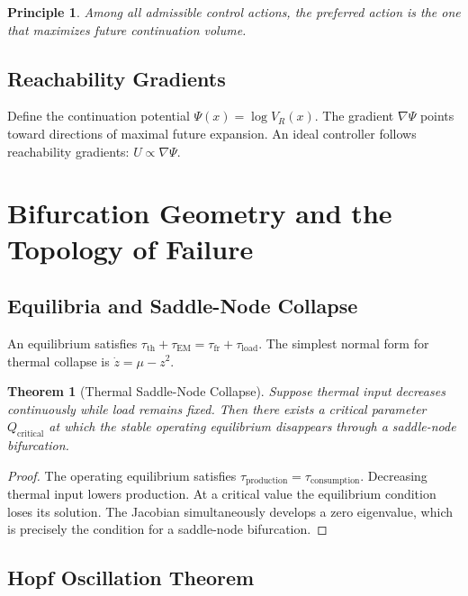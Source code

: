 \documentclass[12pt,a4paper]{article}
\newtheorem{theorem}{Theorem}[section]
\newtheorem*{principle}{Principle}
\begin{document}
\begin{principle}
Among all admissible control actions, the preferred action is the one that maximizes future continuation volume.
\end{principle}

\subsection{Reachability Gradients}

Define the continuation potential $\Psi(x) = \log V_R(x)$. The gradient $\nabla\Psi$ points toward directions of maximal future expansion. An ideal controller follows reachability gradients: $U \propto \nabla\Psi$.

\section{Bifurcation Geometry and the Topology of Failure}

\subsection{Equilibria and Saddle-Node Collapse}

An equilibrium satisfies $\tau_{\mathrm{th}} + \tau_{\mathrm{EM}} = \tau_{\mathrm{fr}} + \tau_{\mathrm{load}}$. The simplest normal form for thermal collapse is $\dot z = \mu - z^2$.

\begin{theorem}[Thermal Saddle-Node Collapse]
Suppose thermal input decreases continuously while load remains fixed. Then there exists a critical parameter $Q_{\mathrm{critical}}$ at which the stable operating equilibrium disappears through a saddle-node bifurcation.
\end{theorem}

\begin{proof}
The operating equilibrium satisfies $\tau_{\mathrm{production}} = \tau_{\mathrm{consumption}}$. Decreasing thermal input lowers production. At a critical value the equilibrium condition loses its solution. The Jacobian simultaneously develops a zero eigenvalue, which is precisely the condition for a saddle-node bifurcation.
\end{proof}

\subsection{Hopf Oscillation Theorem}
\end{document}
